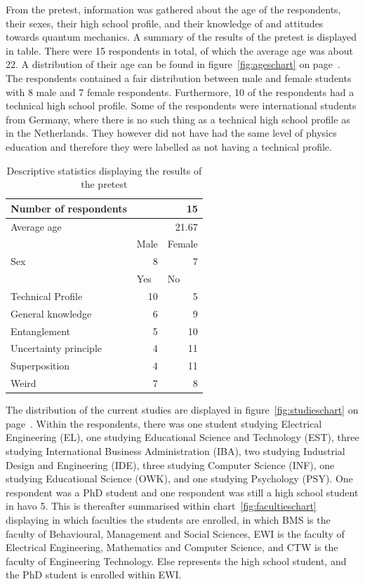 \documentclass[11pt,twoside]{report} %
\begin{document}
From the pretest, information was gathered about the age of the respondents, their sexes, their high school profile, and their knowledge of and attitudes towards quantum mechanics. A summary of the results of the pretest is displayed in table. There were 15 respondents in total, of which the average age was about 22. A distribution of their age can be found in figure~\ref{fig:ageschart} on page~\pageref{fig:ageschart}. The respondents contained a fair distribution between male and female students with 8 male and 7 female respondents. Furthermore, 10 of the respondents had a technical high school profile. Some of the respondents were international students from Germany, where there is no such thing as a technical high school profile as in the Netherlands. They however did not have had the same level of physics education and therefore they were labelled as not having a technical profile.

\begin{table}[htbp]
\begin{center}
\begin{tabular}{|l|r|r|}
\hline
Number of respondents & \multicolumn{2}{r|}{15}  \\ \hline
Average age & \multicolumn{2}{r|}{21.67}  \\ \hline
 & \multicolumn{1}{l|}{Male} & \multicolumn{1}{l|}{Female} \\ \hline
Sex & 8 & 7 \\ \hline
 & \multicolumn{1}{l|}{Yes} & \multicolumn{1}{l|}{No} \\ \hline
Technical Profile & 10 & 5 \\ \hline
General knowledge & 6 & 9 \\ \hline
Entanglement & 5 & 10 \\ \hline
Uncertainty principle & 4 & 11 \\ \hline
Superposition & 4 & 11 \\ \hline
Weird & 7 & 8 \\ \hline
\end{tabular}
\caption{Descriptive statistics displaying the results of the pretest}
\end{center}
\label{tab:descriptive}
\end{table}

The distribution of the current studies are displayed in figure~\ref{fig:studieschart} on page~\pageref{fig:studieschart}. Within the respondents, there was one student studying Electrical Engineering (EL), one studying Educational Science and Technology (EST), three studying International Business Administration (IBA), two studying Industrial Design and Engineering (IDE), three studying Computer Science (INF), one studying Educational Science (OWK), and one studying Psychology (PSY). One respondent was a PhD student and one respondent was still a high school student in havo 5. This is thereafter summarised within chart~\ref{fig:facultieschart} displaying in which faculties the students are enrolled, in which BMS is the faculty of Behavioural, Management and Social Sciences, EWI is the faculty of Electrical Engineering, Mathematics and Computer Science, and CTW is the faculty of Engineering Technology. Else represents the high school student, and the PhD student is enrolled within EWI.
\end{document}
